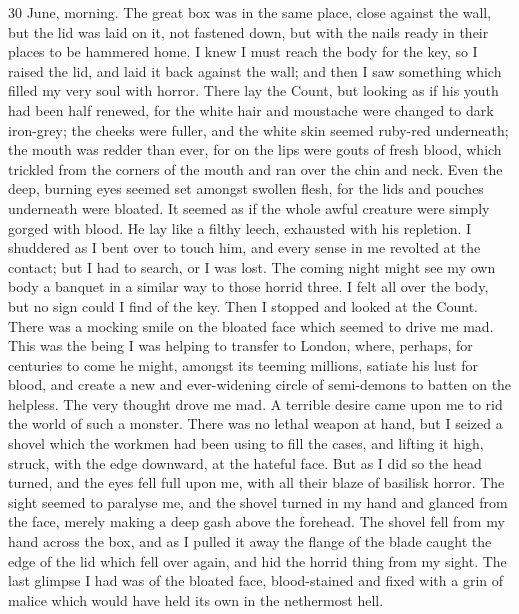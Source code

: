 \begin{diary}{30 June, morning.}
The great box was in the same place, close against the wall, but the lid was laid on it, not fastened down, but with the nails ready in their places to be hammered home. I knew I must reach the body for the key, so I raised the lid, and laid it back against the wall; and then I saw something which filled my very soul with horror. There lay the Count, but looking as if his youth had been half renewed, for the white hair and moustache were changed to dark iron-grey; the cheeks were fuller, and the white skin seemed ruby-red underneath; the mouth was redder than ever, for on the lips were gouts of fresh blood, which trickled from the corners of the mouth and ran over the chin and neck. Even the deep, burning eyes seemed set amongst swollen flesh, for the lids and pouches underneath were bloated. It seemed as if the whole awful creature were simply gorged with blood. He lay like a filthy leech, exhausted with his repletion. I shuddered as I bent over to touch him, and every sense in me revolted at the contact; but I had to search, or I was lost. The coming night might see my own body a banquet in a similar way to those horrid three. I felt all over the body, but no sign could I find of the key. Then I stopped and looked at the Count. There was a mocking smile on the bloated face which seemed to drive me mad. This was the being I was helping to transfer to London, where, perhaps, for centuries to come he might, amongst its teeming millions, satiate his lust for blood, and create a new and ever-widening circle of semi-demons to batten on the helpless. The very thought drove me mad. A terrible desire came upon me to rid the world of such a monster. There was no lethal weapon at hand, but I seized a shovel which the workmen had been using to fill the cases, and lifting it high, struck, with the edge downward, at the hateful face. But as I did so the head turned, and the eyes fell full upon me, with all their blaze of basilisk horror. The sight seemed to paralyse me, and the shovel turned in my hand and glanced from the face, merely making a deep gash above the forehead. The shovel fell from my hand across the box, and as I pulled it away the flange of the blade caught the edge of the lid which fell over again, and hid the horrid thing from my sight. The last glimpse I had was of the bloated face, blood-stained and fixed with a grin of malice which would have held its own in the nethermost hell.


\end{diary}
